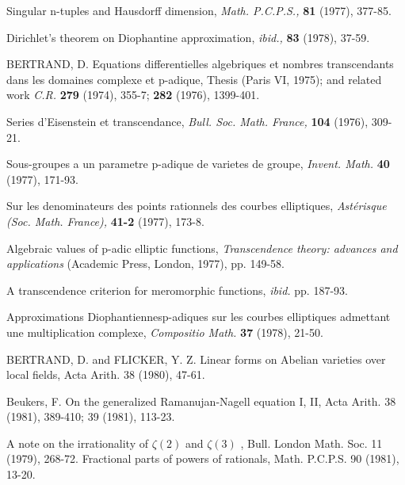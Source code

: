 \begin{hanglist}
    \item \hspace{1.5em} Singular n-tuples and Hausdorff dimension, \textit{Math. P.C.P.S.,} \textbf{81} (1977), 377-85.
    \item \hspace{1.5em} Dirichlet's theorem on Diophantine approximation, \textit{ibid.,} \textbf{83} (1978), 37-59.
    \item BERTRAND, D. Equations differentielles algebriques et nombres transcendants dans les domaines complexe et p-adique, Thesis (Paris VI, 1975); and related work \textit{C.R.} \textbf{279} (1974), 355-7; \textbf{282} (1976), 1399-401.
    \item \hspace{1.5em} Series d'Eisenstein et transcendance, \textit{Bull. Soc. Math. France,} \textbf{104} (1976), 309-21.
    \item \hspace{1.5em} Sous-groupes a un parametre p-adique de varietes de groupe, \textit{Invent. Math.} \textbf{40} (1977), 171-93.
    \item \hspace{1.5em} Sur les denominateurs des points rationnels des courbes elliptiques, \textit{Ast\'{e}risque (Soc. Math. France),} \textbf{41-2} (1977), 173-8.
    \item \hspace{1.5em} Algebraic values of p-adic elliptic functions, \textit{Transcendence theory: advances and applications} (Academic Press, London, 1977), pp. 149-58.
    \item \hspace{1.5em} A transcendence criterion for meromorphic functions, \textit{ibid.} pp. 187-93.
    \item \hspace{1.5em} Approximations Diophantiennesp-adiques sur les courbes elliptiques admettant une multiplication complexe, \textit{Compositio Math.} \textbf{37} (1978), 21-50.
    \item BERTRAND, D. and FLICKER, Y. Z. Linear forms on Abelian varieties over local fields, Acta Arith. 38 (1980), 47-61.
    \item Beukers, F. On the generalized Ramanujan-Nagell equation I, II, Acta Arith. 38 (1981), 389-410; 39 (1981), 113-23.
    \item \hspace{1.5em} A note on the irrationality of  $\zeta(2)$  and  $\zeta(3)$ , Bull. London Math. Soc. 11 (1979), 268-72. Fractional parts of powers of rationals, Math. P.C.P.S. 90 (1981), 13-20.

\end{hanglist}
